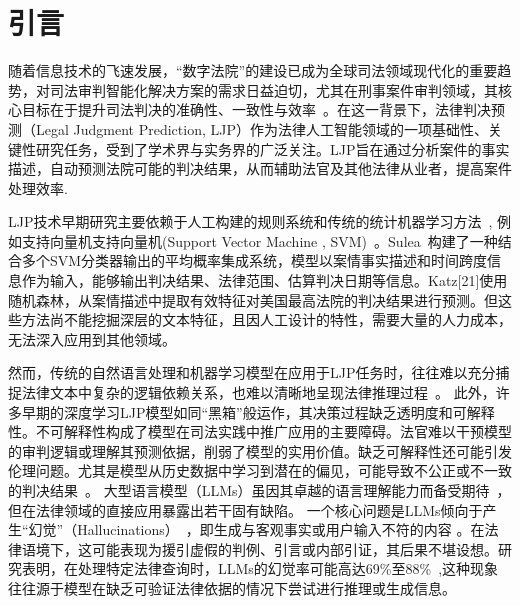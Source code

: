 \section{\heiti 引言}

随着信息技术的飞速发展，“数字法院”的建设已成为全球司法领域现代化的重要趋势，对司法审判智能化解决方案的需求日益迫切，尤其在刑事案件审判领域，其核心目标在于提升司法判决的准确性、一致性与效率~\cite{aletras2016predicting}。在这一背景下，法律判决预测（Legal Judgment Prediction, LJP）作为法律人工智能领域的一项基础性、关键性研究任务，受到了学术界与实务界的广泛关注。LJP旨在通过分析案件的事实描述，自动预测法院可能的判决结果，从而辅助法官及其他法律从业者，提高案件处理效率.

LJP技术早期研究主要依赖于人工构建的规则系统和传统的统计机器学习方法~\cite{katz2017general,keown1980mathematical}, 例如支持向量机支持向量机(Support Vector  Machine , SVM)~\cite{boella2011using,kim2015legal}。Sulea~\cite{sulea2017exploring}构建了一种结合多个SVM分类器输出的平均概率集成系统，模型以案情事实描述和时间跨度信息作为输入，能够输出判决结果、法律范围、估算判决日期等信息。Katz[21]使用随机森林，从案情描述中提取有效特征对美国最高法院的判决结果进行预测。但这些方法尚不能挖掘深层的文本特征，且因人工设计的特性，需要大量的人力成本，无法深入应用到其他领域。

然而，传统的自然语言处理和机器学习模型在应用于LJP任务时，往往难以充分捕捉法律文本中复杂的逻辑依赖关系，也难以清晰地呈现法律推理过程~\cite{lin2012exploiting,liu2004case}。
此外，许多早期的深度学习LJP模型如同“黑箱”般运作，其决策过程缺乏透明度和可解释性。不可解释性构成了模型在司法实践中推广应用的主要障碍\cite{ling2017program,ma2021law}。法官难以干预模型的审判逻辑或理解其预测依据，削弱了模型的实用价值。缺乏可解释性还可能引发伦理问题。尤其是模型从历史数据中学习到潜在的偏见，可能导致不公正或不一致的判决结果~\cite{luo2017learning,lv2022improving}。
大型语言模型（LLMs）虽因其卓越的语言理解能力而备受期待~\cite{jiang2023legal}，但在法律领域的直接应用暴露出若干固有缺陷。
一个核心问题是LLMs倾向于产生“幻觉”（Hallucinations）~\cite{lewis2020retrieval}，即生成与客观事实或用户输入不符的内容 。在法律语境下，这可能表现为援引虚假的判例、引言或内部引证，其后果不堪设想。研究表明，在处理特定法律查询时，LLMs的幻觉率可能高达69\%至88\%~\cite{Dahl_2024},这种现象往往源于模型在缺乏可验证法律依据的情况下尝试进行推理或生成信息。

